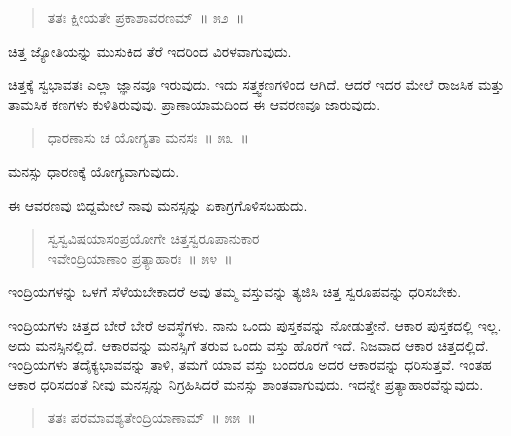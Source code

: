 
\begin{verse}
ತತಃ ಕ್ಷೀಯತೇ ಪ್ರಕಾಶಾವರಣಮ್​~॥ ೫೨~॥
\end{verse}


ಚಿತ್ತ ಜ್ಯೋತಿಯನ್ನು ಮುಸುಕಿದ ತೆರೆ ಇದರಿಂದ ವಿರಳವಾಗುವುದು. 

ಚಿತ್ತಕ್ಕೆ ಸ್ವಭಾವತಃ ಎಲ್ಲಾ ಜ್ಞಾನವೂ ಇರುವುದು. ಇದು ಸತ್ತ್ವಕಣಗಳಿಂದ ಆಗಿದೆ. ಆದರೆ ಇದರ ಮೇಲೆ ರಾಜಸಿಕ ಮತ್ತು ತಾಮಸಿಕ ಕಣಗಳು ಕುಳಿತಿರುವುವು. ಪ್ರಾಣಾಯಾಮದಿಂದ ಈ ಆವರಣವೂ ಜಾರುವುದು. 


\begin{verse}
ಧಾರಣಾಸು ಚ ಯೋಗ್ಯತಾ ಮನಸಃ~॥ ೫೩~॥
\end{verse}


ಮನಸ್ಸು ಧಾರಣಕ್ಕೆ ಯೋಗ್ಯವಾಗುವುದು. 

ಈ ಆವರಣವು ಬಿದ್ದಮೇಲೆ ನಾವು ಮನಸ್ಸನ್ನು ಏಕಾಗ್ರಗೊಳಿಸಬಹುದು. 


\begin{verse}
ಸ್ವಸ್ವವಿಷಯಾಸಂಪ್ರಯೋಗೇ ಚಿತ್ತಸ್ವರೂಪಾನುಕಾರ\\ ಇವೇಂದ್ರಿಯಾಣಾಂ ಪ್ರತ್ಯಾಹಾರಃ~॥ ೫೪~॥
\end{verse}


ಇಂದ್ರಿಯಗಳನ್ನು ಒಳಗೆ ಸೆಳೆಯಬೇಕಾದರೆ ಅವು ತಮ್ಮ ವಸ್ತುವನ್ನು ತ್ಯಜಿಸಿ ಚಿತ್ತ ಸ್ವರೂಪವನ್ನು ಧರಿಸಬೇಕು. 

\vskip 3pt

ಇಂದ್ರಿಯಗಳು ಚಿತ್ತದ ಬೇರೆ ಬೇರೆ ಅವಸ್ಥೆಗಳು. ನಾನು ಒಂದು ಪುಸ್ತಕವನ್ನು ನೋಡುತ್ತೇನೆ. ಆಕಾರ ಪುಸ್ತಕದಲ್ಲಿ ಇಲ್ಲ. ಅದು ಮನಸ್ಸಿನಲ್ಲಿದೆ. ಆಕಾರವನ್ನು ಮನಸ್ಸಿಗೆ ತರುವ ಒಂದು ವಸ್ತು ಹೊರಗೆ ಇದೆ. ನಿಜವಾದ ಆಕಾರ ಚಿತ್ತದಲ್ಲಿದೆ. ಇಂದ್ರಿಯಗಳು ತದೈಕ್ಯಭಾವವನ್ನು ತಾಳಿ, ತಮಗೆ ಯಾವ ವಸ್ತು ಬಂದರೂ ಅದರ ಆಕಾರವನ್ನು ಧರಿಸುತ್ತವೆ. ಇಂತಹ ಆಕಾರ ಧರಿಸದಂತೆ ನೀವು ಮನಸ್ಸನ್ನು ನಿಗ್ರಹಿಸಿದರೆ ಮನಸ್ಸು ಶಾಂತವಾಗುವುದು. ಇದನ್ನೇ ಪ್ರತ್ಯಾಹಾರವೆನ್ನುವುದು. 


\begin{verse}
ತತಃ ಪರಮಾವಶ್ಯತೇಂದ್ರಿಯಾಣಾಮ್​~॥ ೫೫~॥
\end{verse}

\vspace{-0.3cm}

